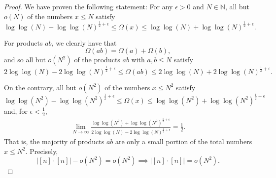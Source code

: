 \documentclass[12pt,reqno]{amsart}
\begin{document}
\begin{proof}
We have proven the following statement: For any \(\epsilon > 0\) and \(N \in \mathbb{N} \), all but \(o(N)\) of the
numbers \(x \leq N\) satisfy
\[
    \log\log \left( N \right) - \log\log \left( N \right) ^{\frac{1}{2} + \epsilon} \leq \Omega(x) \leq \log\log \left( N \right) + \log\log \left( N \right) ^{\frac{1}{2} + \epsilon} 
.\]

For products \(ab\), we clearly have that
\[
    \Omega(ab) = \Omega(a) + \Omega(b)
,\]
and so all but \(o(N^{2})\) of the products \(ab\) with \(a,b \leq N\) satisfy
\[
    2\log\log \left( N \right) - 2\log\log \left( N \right) ^{\frac{1}{2} + \epsilon} \leq \Omega(ab) \leq 2\log\log \left( N \right) + 2\log\log \left( N \right) ^{\frac{1}{2} + \epsilon} 
.\]

On the contrary, all but \(o(N^{2})\) of the numbers \(x \leq N^{2}\) satisfy
\[
    \log\log \left( N^{2} \right) - \log\log \left( N^{2} \right) ^{\frac{1}{2} + \epsilon} \leq \Omega(x) \leq \log\log \left( N^{2} \right) + \log\log \left( N^{2} \right) ^{\frac{1}{2} + \epsilon} 
\]
and, for \(\epsilon < \frac{1}{2} \),
\begin{align*}
\lim_{N \to \infty} \frac{\log\log \left( N^{2} \right) + \log\log \left( N^{2} \right) ^{\frac{1}{2} + \epsilon}}{2 \log\log \left( N \right) - 2 \log\log \left( N \right) ^{\frac{1}{2} +\epsilon}} = \frac{1}{2}.
\end{align*}
That is, the majority of products \(ab\) are only a small portion of the total numbers
\(x \leq N^{2}\). Precisely,
\[
    \left\lvert [n] \cdot [n] \right\rvert - o(N^{2}) = o(N^{2}) \implies \left\lvert [n] \cdot [n] \right\rvert = o(N^{2})
.\]

\end{proof}
\end{document}
